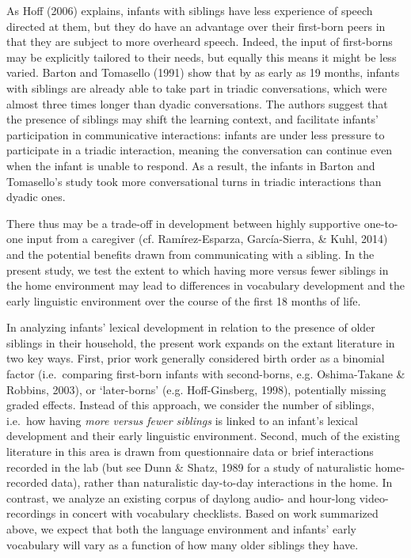 \documentclass[
  man,floatsintext]{apa6}
\begin{document}
As Hoff (2006) explains, infants with siblings have less experience of speech directed at them, but they do have an advantage over their first-born peers in that they are subject to more overheard speech. Indeed, the input of first-borns may be explicitly tailored to their needs, but equally this means it might be less varied. Barton and Tomasello (1991) show that by as early as 19 months, infants with siblings are already able to take part in triadic conversations, which were almost three times longer than dyadic conversations. The authors suggest that the presence of siblings may shift the learning context, and facilitate infants' participation in communicative interactions: infants are under less pressure to participate in a triadic interaction, meaning the conversation can continue even when the infant is unable to respond. As a result, the infants in Barton and Tomasello's study took more conversational turns in triadic interactions than dyadic ones.

There thus may be a trade-off in development between highly supportive one-to-one input from a caregiver (cf. Ramírez-Esparza, García-Sierra, \& Kuhl, 2014) and the potential benefits drawn from communicating with a sibling. In the present study, we test the extent to which having more versus fewer siblings in the home environment may lead to differences in vocabulary development and the early linguistic environment over the course of the first 18 months of life.

In analyzing infants' lexical development in relation to the presence of older siblings in their household, the present work expands on the extant literature in two key ways. First, prior work generally considered birth order as a binomial factor (i.e.~comparing first-born infants with second-borns, e.g. Oshima-Takane \& Robbins, 2003), or `later-borns' (e.g. Hoff-Ginsberg, 1998), potentially missing graded effects. Instead of this approach, we consider the number of siblings, i.e.~how having \emph{more versus fewer siblings} is linked to an infant's lexical development and their early linguistic environment. Second, much of the existing literature in this area is drawn from questionnaire data or brief interactions recorded in the lab (but see Dunn \& Shatz, 1989 for a study of naturalistic home-recorded data), rather than naturalistic day-to-day interactions in the home. In contrast, we analyze an existing corpus of daylong audio- and hour-long video-recordings in concert with vocabulary checklists. Based on work summarized above, we expect that both the language environment and infants' early vocabulary will vary as a function of how many older siblings they have.
\end{document}

